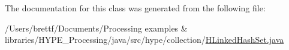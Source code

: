 The documentation for this class was generated from the following file\-:\begin{DoxyCompactItemize}
\item 
/\-Users/brettf/\-Documents/\-Processing examples \& libraries/\-H\-Y\-P\-E\-\_\-\-Processing/java/src/hype/collection/\hyperlink{_h_linked_hash_set_8java}{H\-Linked\-Hash\-Set.\-java}\end{DoxyCompactItemize}
